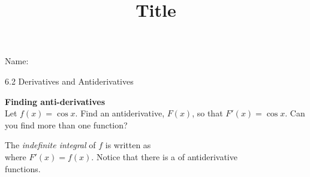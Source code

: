 \documentclass[12pt]{article}
\title{Title}
\begin{document}
 Name:
 \begin{center}\large{6.2 Derivatives and Antiderivatives}\end{center}

\textbf{Finding anti-derivatives}\\
Let $f(x)=\cos x$. Find an antiderivative, $F(x)$, so that $F'(x)=\cos x$. Can you find more than one function?

\vfill
\begin{tcolorbox}
The \textit{indefinite integral} of $f$ is written as \underline{\hspace{8cm}}\\ %

where $F'(x)=f(x)$. Notice that there is a \underline{\hspace{4cm}} of antiderivative\\ 
functions.
\end{tcolorbox}
\end{document}
